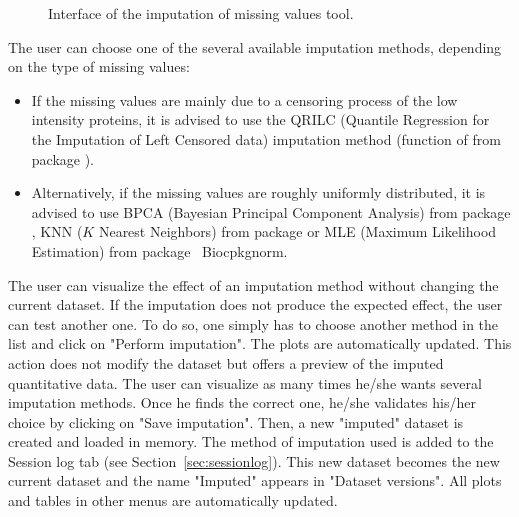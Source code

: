 \documentclass[12pt]{article}
\begin{document}
\begin {figure}
\centering
{}
\caption{Interface of the imputation of missing values tool.}\label{fig:impu}
\end {figure}


The user can choose one of the several available imputation methods, depending 
on the type of missing values:
\begin{itemize}
\item If the missing values are mainly due to a censoring process of the low 
intensity proteins, it is advised to use the QRILC (Quantile Regression for 
the Imputation of Left Censored data) imputation method (function 
 of from package ).
\item Alternatively, if the missing values are roughly uniformly distributed,
it is advised to use BPCA (Bayesian Principal Component Analysis) from 
package , KNN ($K$ Nearest Neighbors) from package 
 or MLE (Maximum Likelihood Estimation) from package \
Biocpkg{norm}.
\end{itemize}

The user can visualize the effect of an imputation method without changing 
the current dataset. If the imputation does not produce the expected effect, 
the user can test another one. To do so, one simply has to choose another 
method in the list and click on "Perform imputation". The plots are 
automatically updated. This action does not modify the dataset but offers a 
preview of the imputed quantitative data.
The user can visualize as many times he/she wants several imputation methods. 
Once he finds the correct one, he/she validates his/her choice by clicking on 
"Save imputation". Then, a new "imputed" dataset is created and loaded in 
memory. The method of imputation used is added to the Session log tab (see 
Section~\ref{sec:sessionlog}). This new dataset becomes the new current 
dataset and the name "Imputed" appears in "Dataset versions". All plots and 
tables in other menus are automatically updated.
\end{document}
